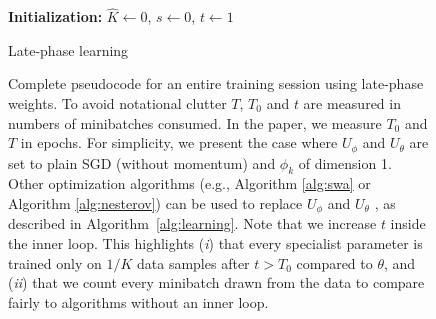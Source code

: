 \documentclass{article} \usepackage{iclr2021_conference,times}
\begin{document}
\begin{figure}[h!]
\centering
\begin{minipage}{0.8\textwidth}
    \begin{algorithm}[H]
      \textbf{Initialization:} $\hat{K} \gets 0$, $s \gets 0$, $t \gets 1$\\
      
      \caption{Late-phase learning\label{alg:learning_2}}
     \end{algorithm}
 \hspace{0.5cm}
\end{minipage}
  \caption{Complete pseudocode for an entire training session using late-phase weights. To avoid notational clutter $T$, $T_0$ and $t$ are measured in numbers of minibatches consumed. In the paper, we measure $T_0$ and $T$ in epochs. For simplicity, we present the case where $U_{\phi}$ and $U_{\theta}$ are set to plain SGD (without momentum) and $\phi_k$ of dimension 1. Other optimization algorithms (e.g., Algorithm \ref{alg:swa} or Algorithm \ref{alg:nesterov}) can be used to replace $U_{\phi}$ and $U_{\theta}$ , as described in Algorithm~\ref{alg:learning}. Note that we increase $t$ inside the inner loop. This highlights  (\textit{i}) that
   every specialist parameter is trained only on $1/K$ data samples after $t > T_0$ compared to $\theta$, and (\textit{ii}) that  we count every minibatch drawn from the data to compare fairly to algorithms without an inner loop.}
\end{figure}
\end{document}
